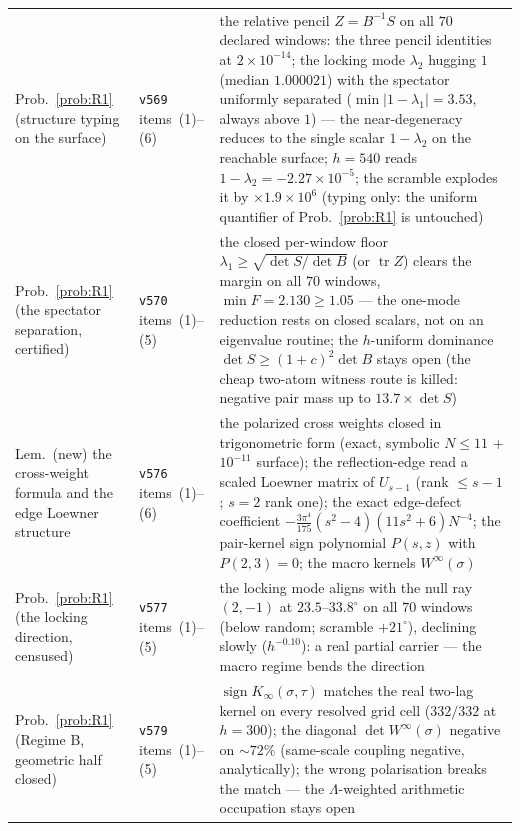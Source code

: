 \documentclass[11pt,a4paper]{article}
\theoremstyle{plain}
\theoremstyle{definition}
\begin{document}
{\begin{xltabular}{\textwidth}{@{}llY@{}}
Prob.~\ref{prob:R1} (structure typing on the surface)
  & \texttt{v569} items~(1)--(6)
  & the relative pencil $Z=B^{-1}S$ on all $70$ declared windows: the three
    pencil identities at $2\times10^{-14}$; the locking mode $\lambda_2$
    hugging $1$ (median $1.000021$) with the spectator uniformly separated
    ($\min|1-\lambda_1|=3.53$, always above $1$) --- the near-degeneracy
    reduces to the single scalar $1-\lambda_2$ on the reachable surface;
    $h=540$ reads $1-\lambda_2=-2.27\times10^{-5}$; the scramble explodes it
    by $\times1.9\times10^{6}$ (typing only: the uniform quantifier of
    Prob.~\ref{prob:R1} is untouched) \\
Prob.~\ref{prob:R1} (the spectator separation, certified)
  & \texttt{v570} items~(1)--(5)
  & the closed per-window floor $\lambda_1\ge\sqrt{\det S/\det B}$ (or
    $\operatorname{tr}Z$) clears the margin on all $70$ windows,
    $\min F=2.130\ge1.05$ --- the one-mode reduction rests on closed
    scalars, not on an eigenvalue routine; the $h$-uniform dominance
    $\det S\ge(1+c)^2\det B$ stays open (the cheap two-atom witness route
    is killed: negative pair mass up to $13.7\times\det S$) \\
Lem.~(new) the cross-weight formula and the edge Loewner structure
  & \texttt{v576} items~(1)--(6)
  & the polarized cross weights closed in trigonometric form (exact,
    symbolic $N\le11$ + $10^{-11}$ surface); the reflection-edge read a
    scaled Loewner matrix of $U_{s-1}$ (rank $\le s-1$; $s=2$ rank one);
    the exact edge-defect coefficient
    $-\tfrac{3\pi^4}{175}(s^2-4)(11s^2+6)N^{-4}$; the pair-kernel sign
    polynomial $P(s,z)$ with $P(2,3)=0$; the macro kernels
    $W^\infty(\sigma)$ \\
Prob.~\ref{prob:R1} (the locking direction, censused)
  & \texttt{v577} items~(1)--(5)
  & the locking mode aligns with the null ray $(2,-1)$ at
    $23.5$--$33.8^\circ$ on all $70$ windows (below random; scramble
    $+21^\circ$), declining slowly ($h^{-0.10}$): a real partial
    carrier --- the macro regime bends the direction \\
Prob.~\ref{prob:R1} (Regime B, geometric half closed)
  & \texttt{v579} items~(1)--(5)
  & $\operatorname{sign}K_\infty(\sigma,\tau)$ matches the real two-lag
    kernel on every resolved grid cell ($332/332$ at $h=300$); the
    diagonal $\det W^\infty(\sigma)$ negative on ${\sim}72\%$
    (same-scale coupling negative, analytically); the wrong polarisation
    breaks the match --- the $\Lambda$-weighted arithmetic occupation
    stays open \\

\end{xltabular}}
\end{document}
